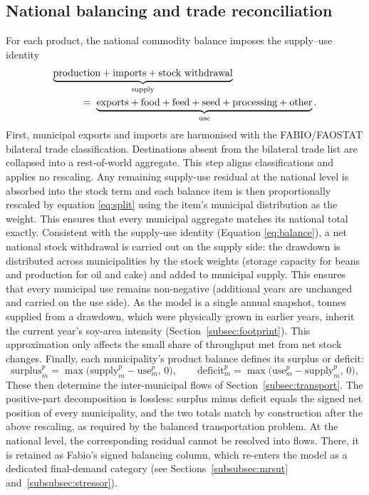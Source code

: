 \documentclass[pdflatex,sn-nature]{sn-jnl}%
\begin{document}
\subsection{National balancing and trade reconciliation}\label{subsec:balancing}
For each product, the national commodity balance imposes the supply--use
identity
\begin{equation}\label{eq:balance}
\begin{aligned}
  \underbrace{\text{production}+\text{imports}+\text{stock withdrawal}}_{\text{supply}}
  \hspace{28mm}&\\[-1pt]
  =\;\underbrace{\text{exports}+\text{food}+\text{feed}+\text{seed}
    +\text{processing}+\text{other}}_{\text{use}}&\,.
\end{aligned}
\end{equation}
First, municipal exports and imports are harmonised with the FABIO/FAOSTAT bilateral trade classification. Destinations absent from the bilateral trade list are collapsed into a rest-of-world aggregate. This step aligns classifications and applies no rescaling. Any remaining supply-use residual at the national level is absorbed into the stock term and each balance item is then proportionally rescaled by equation \eqref{eq:split} using the item's municipal distribution as the weight. This ensures that every municipal aggregate matches its national total exactly. Consistent with the supply-use identity (Equation \eqref{eq:balance}), a net national stock withdrawal is carried out on the supply side: the drawdown is distributed across municipalities by the stock weights (storage capacity for beans and production for oil and cake) and added to municipal supply. This ensures that every municipal use remains non-negative (additional years are unchanged and carried on the use side). As the model is a single annual snapshot, tonnes supplied from a drawdown, which were physically grown in earlier years, inherit the current year's soy-area intensity
(Section~\ref{subsec:footprint}). This approximation only affects the small share of throughput met from net stock changes. Finally, each municipality's product balance defines its surplus or deficit:
\begin{equation}\label{eq:surplus}
  \text{surplus}^p_m=\max\!\big(\text{supply}^p_m-\text{use}^p_m,\,0\big),
  \qquad
  \text{deficit}^p_m=\max\!\big(\text{use}^p_m-\text{supply}^p_m,\,0\big),
\end{equation}
These then determine the inter-municipal flows of Section~\ref{subsec:transport}.
The positive-part decomposition is lossless: surplus minus deficit equals the
signed net position of every municipality, and the two totals match by
construction after the above rescaling, as required by the balanced transportation problem. At the national level, the corresponding residual cannot be resolved into flows. There, it is retained as Fabio's signed balancing column, which re-enters the model as a dedicated final-demand category (see Sections~\ref{subsubsec:mrsut} and~\ref{subsubsec:stressor}).
\end{document}
